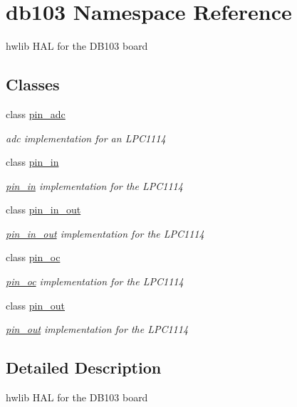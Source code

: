 \hypertarget{namespacedb103}{}\section{db103 Namespace Reference}
\label{namespacedb103}


hwlib H\+AL for the D\+B103 board  


\subsection*{Classes}
\begin{DoxyCompactItemize}
\item 
class \hyperlink{classdb103_1_1pin__adc}{pin\+\_\+adc}
\begin{DoxyCompactList}\small\item\em adc implementation for an L\+P\+C1114 \end{DoxyCompactList}\item 
class \hyperlink{classdb103_1_1pin__in}{pin\+\_\+in}
\begin{DoxyCompactList}\small\item\em \hyperlink{classdb103_1_1pin__in}{pin\+\_\+in} implementation for the L\+P\+C1114 \end{DoxyCompactList}\item 
class \hyperlink{classdb103_1_1pin__in__out}{pin\+\_\+in\+\_\+out}
\begin{DoxyCompactList}\small\item\em \hyperlink{classdb103_1_1pin__in__out}{pin\+\_\+in\+\_\+out} implementation for the L\+P\+C1114 \end{DoxyCompactList}\item 
class \hyperlink{classdb103_1_1pin__oc}{pin\+\_\+oc}
\begin{DoxyCompactList}\small\item\em \hyperlink{classdb103_1_1pin__oc}{pin\+\_\+oc} implementation for the L\+P\+C1114 \end{DoxyCompactList}\item 
class \hyperlink{classdb103_1_1pin__out}{pin\+\_\+out}
\begin{DoxyCompactList}\small\item\em \hyperlink{classdb103_1_1pin__out}{pin\+\_\+out} implementation for the L\+P\+C1114 \end{DoxyCompactList}\end{DoxyCompactItemize}


\subsection{Detailed Description}
hwlib H\+AL for the D\+B103 board 

